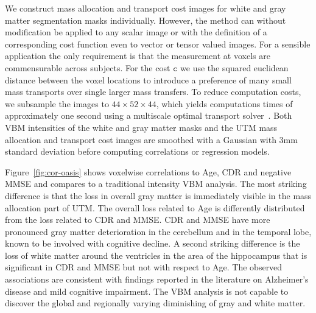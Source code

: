 \documentclass{llncs}
\newcommand{\cost}[0]{\mathtt{c}}
\begin{document}
We construct mass allocation and transport cost images for white and gray
matter segmentation masks individually. However, the method can without
modification be applied to any scalar image or with the definition of a
corresponding cost function even to vector or tensor valued images. For a
sensible application the only requirement is that the measurement at voxels are
commensurable across subjects. For the cost $\cost$ we use the squared
euclidean distance between the voxel locations to introduce a preference of
many small mass transports over single larger mass transfers.  To reduce
computation costs, we subsample the images to $44 \times 52 \times 44$, which
yields computations times of approximately one second using a multiscale
optimal transport solver~\cite{gerber2017multiscale}. Both VBM intensities of
the white and gray matter masks and the UTM mass allocation and transport cost
images are smoothed with a Gaussian with 3mm standard deviation before
computing correlations or regression models.

Figure~\ref{fig:cor-oasis} shows voxelwise correlations to Age, CDR and
negative MMSE and compares to a traditional intensity VBM analysis. The most
striking difference is that the loss in overall gray matter is immediately
visible in the mass allocation part of UTM. The overall loss related to Age is
differently distributed from the loss related to CDR and MMSE. CDR and MMSE
have more pronounced gray matter deterioration in the cerebellum and in the
temporal lobe, known to be involved with cognitive decline. A second striking
difference is the loss of white matter around the ventricles in the area of the
hippocampus that is significant in CDR and MMSE but not with respect to Age.
The observed associations are consistent with findings reported in the
literature on Alzheimer's disease and mild cognitive impairment.  The VBM
analysis is not capable to discover the global and regionally varying
diminishing of gray and white matter. 
\end{document}
